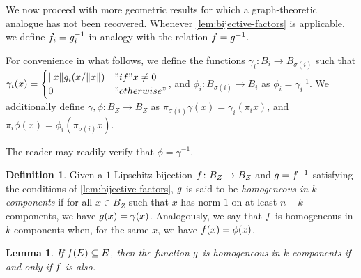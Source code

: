 \documentclass{amsart}
\newtheorem{lemma}{Lemma}[section]
\theoremstyle{definition}
\newtheorem{definition}{Definition}[section]
\begin{document}
We now proceed with more geometric results for which a graph-theoretic analogue has not been recovered. Whenever \autoref{lem:bijective-factors} is applicable, we define $f_i = g_i^{-1}$ in analogy with the relation $f = g^{-1}$.

For convenience in what follows, we define the functions $\gamma_i  \colon B_i \to B_{\sigma(i)}$ such that
$\gamma_i (x) =
\begin{cases}\norm{x} g_i (x/\norm{x}) &"if" x \neq 0\\ 0 &"otherwise"\end{cases}$, and $\phi_i \colon B_{\sigma(i)} \to B_i$ as $\phi_i = \gamma_i^{-1}$. We additionally define
$\gamma, \phi \colon B_Z \to B_Z$ as $\pi_{\sigma(i)} \gamma(x) = \gamma_i (\pi_i x)$, and
$\pi_i \phi(x) = \phi_i (\pi_{\sigma(i)} x)$.

The reader may readily verify that $\phi = \gamma^{-1}$.

\begin{definition} 

  Given a $1$-Lipschitz bijection $f \colon B_Z \to B_Z$ and $g = f^{-1}$ satisfying the conditions of \autoref{lem:bijective-factors}, $g$ is said to be \textit{homogeneous in $k$ components} if for all $x \in B_Z$ such that $x$ has norm $1$ on at least $n-k$ components, we have $g(x) = \gamma(x)$. Analogously, we say that $f$ is homogeneous in $k$ components when, for the same $x$, we have $f(x) = \phi(x)$.
\end{definition}

\begin{lemma} \label{lem:homogeneity-equiv}
\annotation
  If $f(E) \subseteq E$, then
  the function $g$ is homogeneous in $k$ components if and only if
  $f$ is also.
\end{lemma}
\end{document}
